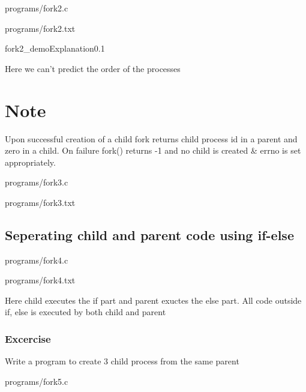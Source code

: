 \documentclass[11pt,fleqn]{book} %
\begin{document}
\begin{mycode}{programs/fork2.c}
\end{mycode}

\begin{myoutput}{programs/fork2.txt}
\end{myoutput}

\begin{myfigure}{fork2_demo}{Explanation}{0.1}
\end{myfigure}

Here we can't predict the order of the processes

\section*{Note}

Upon successful creation of a child fork returns child process id in a parent and zero in a child. On failure fork() returns -1 and no child is created \& errno is set appropriately.

\begin{mycode}{programs/fork3.c}
\end{mycode}

\begin{myoutput}{programs/fork3.txt}
\end{myoutput}

\subsection{Seperating child and parent code using if-else}

\begin{mycode}{programs/fork4.c}
\end{mycode}

\begin{myoutput}{programs/fork4.txt}
\end{myoutput}

Here child executes the if part and parent exuctes the else part. All code outside if, else is executed by both child and parent

\subsubsection*{Excercise}

Write a program to create 3 child process from the same parent

\begin{mycode}{programs/fork5.c}
\end{mycode}
\end{document}
